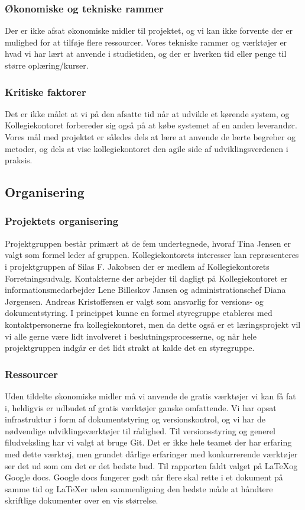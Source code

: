 \documentclass[12pt, a4paper]{report}
\begin{document}
\subsubsection{Økonomiske og tekniske rammer}
Der er ikke afsat økonomiske midler til projektet, og vi kan ikke forvente der er mulighed for at tilføje flere ressourcer. Vores tekniske rammer og værktøjer er hvad vi har lært at anvende i studietiden, og der er hverken tid eller penge til større oplæring/kurser.

\subsubsection{Kritiske faktorer}
Det er ikke målet at vi på den afsatte tid når at udvikle et kørende system, og Kollegiekontoret forbereder sig også på at købe systemet af en anden leverandør. Vores mål med projektet er således dels at lære at anvende de lærte begreber og metoder, og dels at vise kollegiekontoret den agile side af udviklingsverdenen i praksis.

\subsection{Organisering}
\subsubsection{Projektets organisering}
Projektgruppen består primært at de fem undertegnede, hvoraf Tina Jensen er valgt som formel leder af gruppen. Kollegiekontorets interesser kan repræsenteres i projektgruppen af Silas F. Jakobsen der er medlem af Kollegiekontorets Forretningsudvalg. Kontakterne der arbejder til dagligt på Kollegiekontoret er informationsmedarbejder Lene Billeskov Jansen og administrationschef Diana Jørgensen. Andreas Kristoffersen er valgt som ansvarlig for versions- og dokumentstyring.
I princippet kunne en formel styregruppe etableres med kontaktpersonerne fra kollegiekontoret, men da dette også er et læringsprojekt vil vi alle gerne være lidt involveret i beslutningsprocesserne, og når hele projektgruppen indgår er det lidt strakt at kalde det en styregruppe.

\subsubsection{Ressourcer}
Uden tildelte økonomiske midler må vi anvende de gratis værktøjer vi kan få fat i, heldigvis er udbudet af gratis værktøjer ganske omfattende. Vi har opsat infrastruktur i form af dokumentstyring og versionskontrol, og vi har de nødvendige udviklingsværktøjer til rådighed.
Til versionsstyring og generel filudveksling har vi valgt at bruge Git. Det er ikke hele teamet der har erfaring med dette værktøj, men grundet dårlige erfaringer med konkurrerende værktøjer ser det ud som om det er det bedste bud.
Til rapporten faldt valget på \LaTeX og Google docs. Google docs fungerer godt når flere skal rette i et dokument på samme tid og \LaTeX er uden sammenligning den bedste måde at håndtere skriftlige dokumenter over en vis størrelse.
\end{document}
